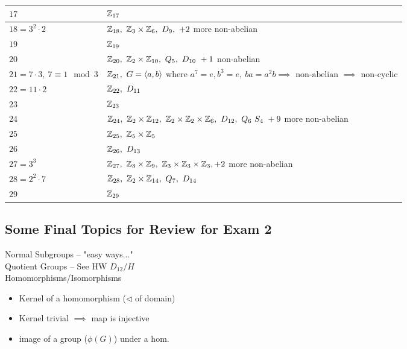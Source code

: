 \begin{table}[ht!]
\begin{tabular}{|l|p{}|}
         $17$ & ${\mathbb{Z}}_{17}$ \\  \hline
         $18=3^2\cdot 2$ & $\Z_{18}, \ \Z_3\times \Z_6, \ D_9,  \ + 2$ more non-abelian \\ \hline
         $19$ & ${\mathbb{Z}}_{19}$ \\ \hline
         $20$ & $\Z_{20}, \ \Z_2\times \Z_{10}, \ Q_5, \ D_{10} \ + 1$ non-abelian \\ \hline
         $21=7\cdot 3, \ 7\equiv 1\mod 3$ & $\Z_{21},  \ G=\langle a,b\rangle$ \newline where $a^7=e, b^3=e, \ ba=a^2b \implies \text{ non-abelian }\implies \text{ non-cyclic}$ \\ \hline
         $22=11\cdot 2$ & $\Z_{22}, \ D_{11}$ \\ \hline
         $23$ & ${\mathbb{Z}}_{23}$ \\ \hline
         $24$ & $\Z_{24}, \ \Z_2\times \Z_{12}, \ \Z_2\times \Z_2\times \Z_6, \ D_{12}, \ Q_6 \ S_{4} \ +9$ more non-abelian \\ \hline
         $25$ & $\Z_{25}, \ \Z_5\times \Z_5$ \\ \hline
         $26$ & $\Z_{26}, \ D_{13}$ \\ \hline
         $27=3^3$ & $\Z_{27}, \ \Z_3\times \Z_9, \ \Z_3\times \Z_3\times \Z_3, + 2$ more non-abelian \\ \hline
         $28=2^2\cdot 7$ & $\Z_{28}, \ \Z_2\times \Z_{14}, \ Q_7, \ D_{14}$ \\ \hline
         $29$ & ${\mathbb{Z}}_{29}$ \\ \hline
    \end{tabular}
\end{table} \steezybreak
\newpage
\subsection*{Some Final Topics for Review for Exam 2}
Normal Subgroups -- "easy ways..." \\

\noindent Quotient Groups -- See HW $D_{12}/H$ \\

\noindent Homomorphisms/Isomorphisms
\begin{itemize}
    \item Kernel of a homomorphism ($\triangleleft$ of domain)
    \item Kernel trivial $\implies$ map is injective
    \item image of a group ($\phi(G)$) under a hom.
\end{itemize}

